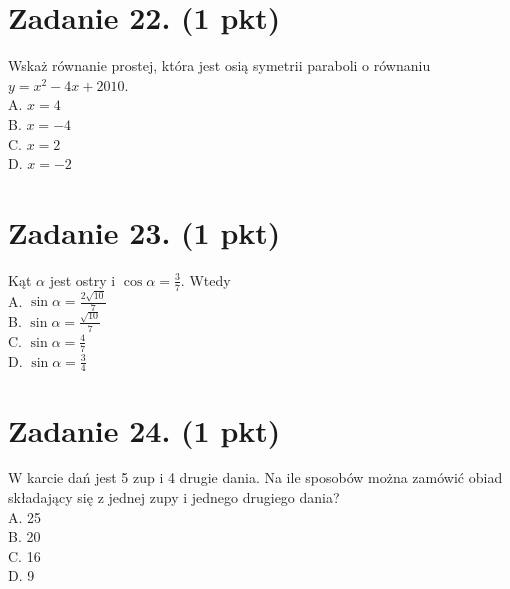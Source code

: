 \documentclass[10pt]{article}
\begin{document}
\section*{Zadanie 22. (1 pkt)}
Wskaż równanie prostej, która jest osią symetrii paraboli o równaniu \(y=x^{2}-4 x+2010\).\\
A. \(x=4\)\\
B. \(x=-4\)\\
C. \(x=2\)\\
D. \(x=-2\)

\section*{Zadanie 23. (1 pkt)}
Kąt \(\alpha\) jest ostry i \(\cos \alpha=\frac{3}{7}\). Wtedy\\
A. \(\sin \alpha=\frac{2 \sqrt{10}}{7}\)\\
B. \(\sin \alpha=\frac{\sqrt{10}}{7}\)\\
C. \(\sin \alpha=\frac{4}{7}\)\\
D. \(\sin \alpha=\frac{3}{4}\)

\section*{Zadanie 24. (1 pkt)}
W karcie dań jest 5 zup i 4 drugie dania. Na ile sposobów można zamówić obiad składający się z jednej zupy i jednego drugiego dania?\\
A. 25\\
B. 20\\
C. 16\\
D. 9
\end{document}
